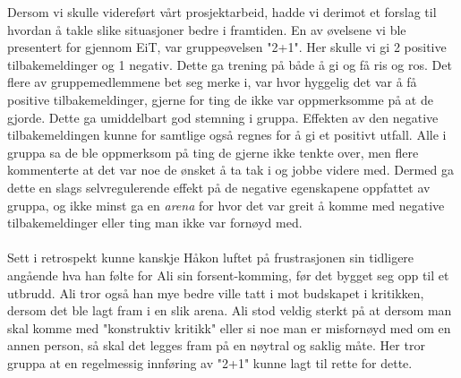 Dersom vi skulle videreført vårt prosjektarbeid, hadde vi derimot et forslag til hvordan å takle slike situasjoner bedre i framtiden. En av øvelsene vi ble presentert for gjennom EiT, var gruppeøvelsen "2+1". Her skulle vi gi 2 positive tilbakemeldinger og 1 negativ. Dette ga trening på både å gi og få ris og ros. Det flere av gruppemedlemmene bet seg merke i, var hvor hyggelig det var å få positive tilbakemeldinger, gjerne for ting de ikke var oppmerksomme på at de gjorde. Dette ga umiddelbart god stemning i gruppa. Effekten av den negative tilbakemeldingen kunne for samtlige også regnes for å gi et positivt utfall. Alle i gruppa sa de ble oppmerksom på ting de gjerne ikke tenkte over, men flere kommenterte at det var noe de ønsket å ta tak i og jobbe videre med. Dermed ga dette en slags selvregulerende effekt på de negative egenskapene oppfattet av gruppa, og ikke minst ga en \textit{arena} for hvor det var greit å komme med negative tilbakemeldinger eller ting man ikke var fornøyd med.\\
\\
Sett i retrospekt kunne kanskje Håkon luftet på frustrasjonen sin tidligere angående hva han følte for Ali sin forsent-komming, før det bygget seg opp til et utbrudd. Ali tror også han mye bedre ville tatt i mot budskapet i kritikken, dersom det ble lagt fram i en slik arena. Ali stod veldig sterkt på at dersom man skal komme med "konstruktiv kritikk" eller si noe man er misfornøyd med om en annen person, så skal det legges fram på en nøytral og saklig måte. Her tror gruppa at en regelmessig innføring av "2+1" kunne lagt til rette for dette.


\newpage